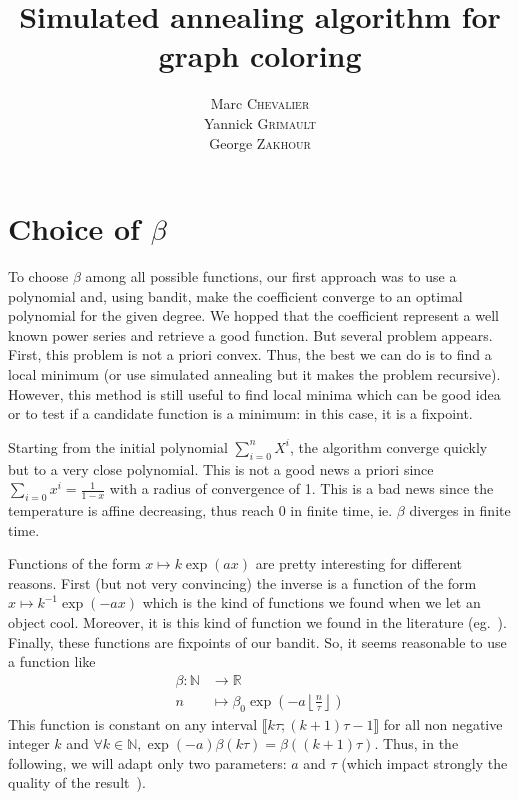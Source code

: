 \documentclass[a4paper, 11pt]{article}
\title{Simulated annealing algorithm for graph coloring}
\author{
	Marc \textsc{Chevalier}\\
	Yannick \textsc{Grimault}\\
	George \textsc{Zakhour}
}
\newcommand{\RR}{\mathbb{R}}
\newcommand{\NN}{\mathbb{N}}
\begin{document}
\maketitle

\section{Choice of \texorpdfstring{$\beta$}{β}}


To choose $\beta$ among all possible functions, our first approach was to use a polynomial and, using bandit, make the coefficient converge to an optimal polynomial for the given degree. We hopped that the coefficient represent a well known power series and retrieve a good function. But several problem appears. First, this problem is not a priori convex. Thus, the best we can do is to find a local minimum (or use simulated annealing but it makes the problem recursive). However, this method is still useful to find local minima which can be good idea or to test if a candidate function is a minimum: in this case, it is a fixpoint.

Starting from the initial polynomial $\sum\limits_{i=0}^n X^i$, the algorithm converge quickly but to a very close polynomial. This is not a good news a priori since $\sum\limits_{i=0} x^i = \frac{1}{1-x}$ with a radius of convergence of 1. This is a bad news since the temperature is affine decreasing, thus reach 0 in finite time, ie. $\beta$ diverges in finite time.

\bigskip

Functions of the form $x\mapsto k\exp(ax)$ are pretty interesting for different reasons. First (but not very convincing) the inverse is a function of the form $x\mapsto k^{-1}\exp(-ax)$ which is the kind of functions we found when we let an object cool. Moreover, it is this kind of function we found in the literature (eg.~\cite{chams1987some}). Finally, these functions are fixpoints of our bandit. So, it seems reasonable to use a function like
\[
	\begin{aligned}
		\beta : \NN &\to \RR\\
		n &\mapsto \beta_0\exp\left(-a\left\lfloor \frac{n}{\tau} \right\rfloor \right)
	\end{aligned}
\]
This function is constant on any interval $\llbracket k\tau; (k+1)\tau -1\rrbracket$ for all non negative integer $k$ and $\forall k\in\NN, \exp(-a)\beta(k\tau) = \beta((k+1)\tau)$. Thus, in the following, we will adapt only two parameters: $a$ and $\tau$ (which impact strongly the quality of the result~\cite{chams1987some}).
\end{document}
